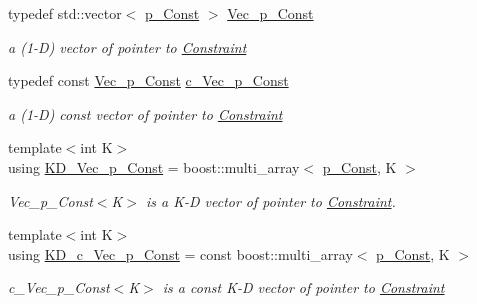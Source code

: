 \begin{DoxyCompactItemize}
typedef std\+::vector$<$ \mbox{\hyperlink{group___constraint___t_y_p_e_s_gae2abae1fd3e9370e1c0cc9dfbb4d6718}{p\+\_\+\+Const}} $>$ \mbox{\hyperlink{group___constraint___t_y_p_e_s_ga4ce7980e39e7cfce6c532e9475fb5001}{Vec\+\_\+p\+\_\+\+Const}}
\begin{DoxyCompactList}\small\item\em a (1-\/D) vector of pointer to \mbox{\hyperlink{class_s_m_spp__di__unipi__it_1_1_constraint}{Constraint}} \end{DoxyCompactList}\item 
typedef const \mbox{\hyperlink{group___constraint___t_y_p_e_s_ga4ce7980e39e7cfce6c532e9475fb5001}{Vec\+\_\+p\+\_\+\+Const}} \mbox{\hyperlink{group___constraint___t_y_p_e_s_gad943734c94d1d3646f49c94dcf3916b5}{c\+\_\+\+Vec\+\_\+p\+\_\+\+Const}}
\begin{DoxyCompactList}\small\item\em a (1-\/D) const vector of pointer to \mbox{\hyperlink{class_s_m_spp__di__unipi__it_1_1_constraint}{Constraint}} \end{DoxyCompactList}\item 
{\footnotesize template$<$int K$>$ }\\using \mbox{\hyperlink{group___constraint___t_y_p_e_s_gad29c159d9cb59d8165cddf1656b987f0}{K\+D\+\_\+\+Vec\+\_\+p\+\_\+\+Const}} = boost\+::multi\+\_\+array$<$ \mbox{\hyperlink{group___constraint___t_y_p_e_s_gae2abae1fd3e9370e1c0cc9dfbb4d6718}{p\+\_\+\+Const}}, K $>$
\begin{DoxyCompactList}\small\item\em Vec\+\_\+p\+\_\+\+Const$<$\+K$>$ is a K-\/D vector of pointer to \mbox{\hyperlink{class_s_m_spp__di__unipi__it_1_1_constraint}{Constraint}}. \end{DoxyCompactList}\item 
{\footnotesize template$<$int K$>$ }\\using \mbox{\hyperlink{group___constraint___t_y_p_e_s_ga3512a46189a9cd213323d9e9c5c083e1}{K\+D\+\_\+c\+\_\+\+Vec\+\_\+p\+\_\+\+Const}} = const boost\+::multi\+\_\+array$<$ \mbox{\hyperlink{group___constraint___t_y_p_e_s_gae2abae1fd3e9370e1c0cc9dfbb4d6718}{p\+\_\+\+Const}}, K $>$
\begin{DoxyCompactList}\small\item\em c\+\_\+\+Vec\+\_\+p\+\_\+\+Const$<$\+K$>$ is a const K-\/D vector of pointer to \mbox{\hyperlink{class_s_m_spp__di__unipi__it_1_1_constraint}{Constraint}} \end{DoxyCompactList}\item 

\end{DoxyCompactItemize}
